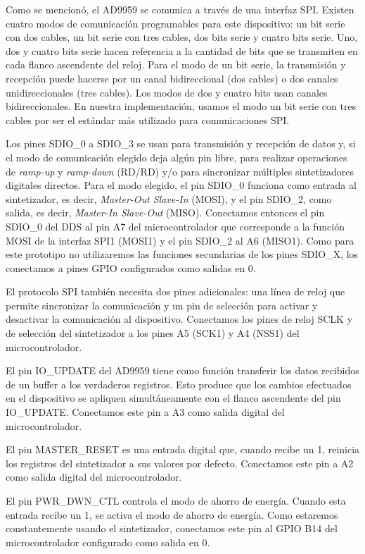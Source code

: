 \documentclass{article}
\newenvironment{standalone}{\begin{preview}}{\end{preview}}
\begin{document}
\begin{standalone}
  Como se mencionó, el AD9959 se comunica a través de una interfaz SPI.
  Existen cuatro modos de comunicación programables para este dispositivo: un bit serie con dos cables, un bit serie con tres cables, dos bits serie y cuatro bits serie.
  Uno, dos y cuatro bits serie hacen referencia a la cantidad de bits que se transmiten en cada flanco ascendente del reloj.
  Para el modo de un bit serie, la transmisión y recepción puede hacerse por un canal bidireccional (dos cables) o dos canales unidireccionales (tres cables).
  Los modos de dos y cuatro bits usan canales bidireccionales.
  En nuestra implementación, usamos el modo un bit serie con tres cables por ser el estándar más utilizado para comunicaciones SPI.

  Los pines SDIO\_0 a SDIO\_3 se usan para transmisión y recepción de datos y, si el modo de comunicación elegido deja algún pin libre, para realizar operaciones de \textit{ramp-up} y \textit{ramp-down} (RD/RD) y/o para sincronizar múltiples sintetizadores digitales directos.
  Para el modo elegido, el pin SDIO\_0 funciona como entrada al sintetizador, es decir, \textit{Master-Out Slave-In} (MOSI), y el pin SDIO\_2, como salida, es decir, \textit{Master-In Slave-Out} (MISO).
  Conectamos entonces el pin SDIO\_0 del DDS al pin A7 del microcontrolador que corresponde a la función MOSI de la interfaz SPI1 (MOSI1) y el pin SDIO\_2 al A6 (MISO1).
  Como para este prototipo no utilizaremos las funciones secundarias de los pines SDIO\_X, los conectamos a pines GPIO configurados como salidas en 0.

  El protocolo SPI también necesita dos pines adicionales: una línea de reloj que permite sincronizar la comunicación y un pin de selección para activar y desactivar la comunicación al dispositivo.
  Conectamos los pines de reloj SCLK y de selección  del sintetizador a los pines A5 (SCK1) y A4 (NSS1) del microcontrolador.

  El pin IO\_UPDATE del AD9959 tiene como función transferir los datos recibidos de un buffer a los verdaderos registros.
  Esto produce que los cambios efectuados en el dispositivo se apliquen simultáneamente con el flanco ascendente del pin IO\_UPDATE.
  Conectamos este pin a A3 como salida digital del microcontrolador.

  El pin MASTER\_RESET es una entrada digital que, cuando recibe un 1, reinicia los registros del sintetizador a sus valores por defecto.
  Conectamos este pin a A2 como salida digital del microcontrolador.

  El pin PWR\_DWN\_CTL controla el modo de ahorro de energía.
  Cuando esta entrada recibe un 1, se activa el modo de ahorro de energía.
  Como estaremos constantemente usando el sintetizador, conectamos este pin al GPIO B14 del microcontrolador configurado como salida en 0.


\end{standalone}
\end{document}

